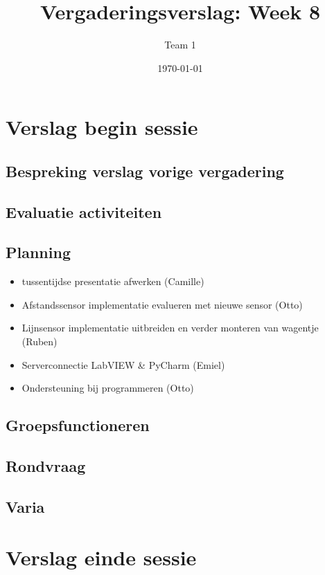 \documentclass[a4paper,kulak]{kulakarticle} %
\date{\today}
\title{Vergaderingsverslag: Week 8}
\author{Team 1}
\begin{document}
\maketitle

\section{Verslag begin sessie}

\subsection{Bespreking verslag vorige vergadering}

\subsection{Evaluatie activiteiten}

\subsection{Planning}
\begin{itemize}
	\item tussentijdse presentatie afwerken (Camille)
	\item Afstandssensor implementatie evalueren met nieuwe sensor (Otto) 
	\item Lijnsensor implementatie uitbreiden en verder monteren van wagentje (Ruben)
	\item Serverconnectie LabVIEW \& PyCharm (Emiel)
	\item Ondersteuning bij programmeren (Otto)
\end{itemize}

\subsection{Groepsfunctioneren}

\subsection{Rondvraag}

\subsection{Varia}




\section{Verslag einde sessie}
\end{document}
